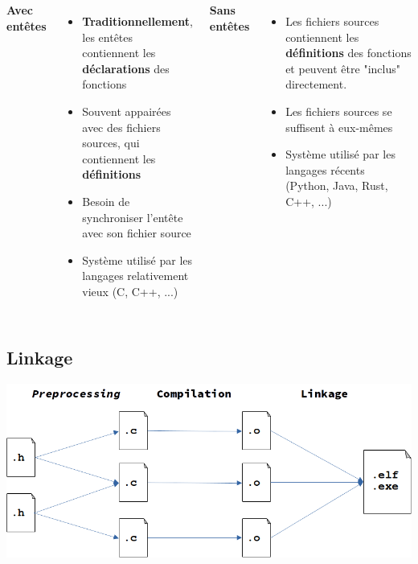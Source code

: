 \documentclass{beamer}
\newenvironment{Frame}{\begin{frame}[containsverbatim]{\subsecname}}{\end{frame}}
\begin{document}
\begin{Frame}
    \begin{columns}
        \centering
        \textbf{Avec entêtes}
        \begin{itemize}
            \item \textbf{Traditionnellement}, les entêtes contiennent les \textbf{déclarations} des fonctions
            \item Souvent appairées avec des fichiers sources, qui contiennent les \textbf{définitions}
            \item Besoin de synchroniser l'entête avec son fichier source
            \item Système utilisé par les langages relativement vieux (C, C++, ...) 
        \end{itemize}

        \centering
        \textbf{Sans entêtes}
        \begin{itemize}
            \item Les fichiers sources contiennent les \textbf{définitions} des fonctions et peuvent être "inclus" directement.
            \item Les fichiers sources se suffisent à eux-mêmes
            \item Système utilisé par les langages récents (Python, Java, Rust, C++, ...)
        \end{itemize}
    \end{columns}
\end{Frame}

\subsection{Linkage}

\begin{Frame}
    \includegraphics[width=\textwidth]{compilation_steps.png}
\end{Frame}
\end{document}
